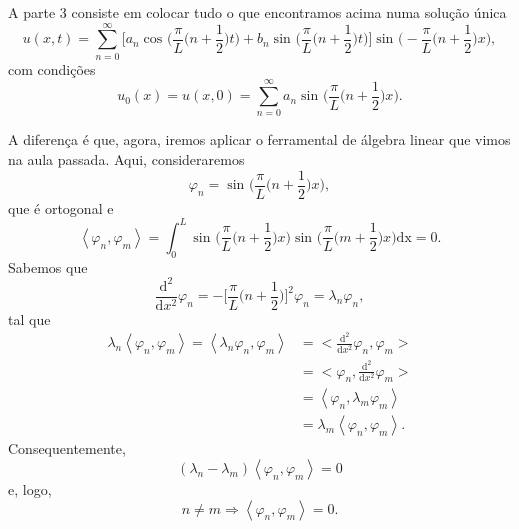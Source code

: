\documentclass[../pde_notes.tex]{subfiles}
\begin{document}
A parte 3 consiste em colocar tudo o que encontramos acima numa solução única
\[
	u(x, t) = \sum\limits_{n=0}^{\infty}\biggl[a_{n}\cos^{}{\biggl(\frac{\pi}{L}\biggl(n+\frac{1}{2}\biggr)t\biggr)} + b_{n}\sin^{}{\biggl(\frac{\pi}{L}\biggl(n+\frac{1}{2}\biggr)t\biggr)}\biggr]\sin^{}{\biggl(-\frac{\pi}{L}\biggl(n+\frac{1}{2}\biggr)x\biggr)},
\]
com condições
\[
	u_{0}(x) = u(x,0) = \sum\limits_{n=0}^{\infty}a_{n}\sin^{}{\biggl(\frac{\pi }{L}\biggl(n+\frac{1}{2}\biggr)x\biggr)}.
\]

A diferença é que, agora, iremos aplicar o ferramental de álgebra linear que vimos na aula passada. Aqui, consideraremos
\[
	\varphi_{n}=\sin^{}{\biggl(\frac{\pi }{L}\biggl(n+\frac{1}{2}\biggr)x\biggr)},
\]
que é ortogonal e
\[
	\left< \varphi_{n}, \varphi_{m} \right> = \int_{0}^{L}\sin^{}{\biggl(\frac{\pi }{L}\biggl(n+\frac{1}{2}\biggr)x\biggr)}\sin^{}{\biggl(\frac{\pi }{L}\biggl(m+\frac{1}{2}\biggr)x\biggr)} \mathrm{dx} = 0.
\]
Sabemos que
\[
	\frac{\mathrm{d}^{2}}{\mathrm{d}x^{2}}\varphi_{n} = -\biggl[\frac{\pi }{L}\biggl(n+\frac{1}{2}\biggr)\biggr]^{2}\varphi_{n} = \lambda_{n}\varphi_{n},
\]
tal que
\begin{align*}
	\lambda_{n}\left< \varphi_{n}, \varphi_{m} \right> = \left< \lambda_{n}\varphi_{n}, \varphi_{m} \right> & = \biggl<\frac{\mathrm{d}^{2}}{\mathrm{d}x^{2}}\varphi_{n} , \varphi_{m} \biggr> \\
	                                                                                                        & = \biggl< \varphi_{n}, \frac{\mathrm{d}^{2}}{\mathrm{d}x^{2}}\varphi_{m} \biggr> \\
	                                                                                                        & = \left< \varphi_{n}, \lambda_{m}\varphi_{m} \right>                             \\
	                                                                                                        & = \lambda_{m}\left< \varphi_{n}, \varphi_{m} \right>.
\end{align*}
Consequentemente,
\[
	(\lambda_{n}-\lambda_{m})\left< \varphi_{n}, \varphi_{m} \right> = 0
\]
e, logo,
\[
	n\neq m \Rightarrow \left< \varphi_{n}, \varphi_{m} \right> = 0.
\]
\end{document}
